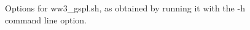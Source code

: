 \begin{figure}[t]
{\footnotesize  }
\caption{Options for {\file ww3\_gspl.sh}, as obtained by running it with the
  {\file -h} command line option.} \label{fig:gspl}
\end{figure}
